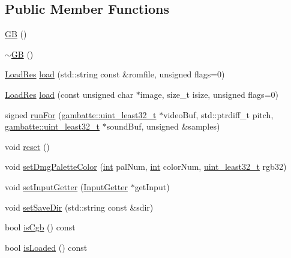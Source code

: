 \subsection*{Public Member Functions}
\begin{DoxyCompactItemize}
\item 
\hyperlink{classgambatte_1_1GB_a360f22e656d5ff564eb0dea987ae71c7}{GB} ()
\item 
\hyperlink{classgambatte_1_1GB_a27727465be963f80f4fd96449a3d9c13}{$\sim$\+GB} ()
\item 
\hyperlink{namespacegambatte_a42606f494711d2e2870a5f5cdf69e468}{Load\+Res} \hyperlink{classgambatte_1_1GB_a3eb7cf83b1634dacc796971760b31fa2}{load} (std\+::string const \&romfile, unsigned flags=0)
\item 
\hyperlink{namespacegambatte_a42606f494711d2e2870a5f5cdf69e468}{Load\+Res} \hyperlink{classgambatte_1_1GB_a4ee8c151c978541fe20a282bdcc68969}{load} (const unsigned char $\ast$image, size\+\_\+t isize, unsigned flags=0)
\item 
signed \hyperlink{classgambatte_1_1GB_a10d409c2865b9c9770bf2a19f6d77dd7}{run\+For} (\hyperlink{namespacegambatte_a0639f09fccfbbd5a8e0796318768e370}{gambatte\+::uint\+\_\+least32\+\_\+t} $\ast$video\+Buf, std\+::ptrdiff\+\_\+t pitch, \hyperlink{namespacegambatte_a0639f09fccfbbd5a8e0796318768e370}{gambatte\+::uint\+\_\+least32\+\_\+t} $\ast$sound\+Buf, unsigned \&samples)
\item 
void \hyperlink{classgambatte_1_1GB_a765c0a392c9801ab094936f2978b5000}{reset} ()
\item 
void \hyperlink{classgambatte_1_1GB_a051afa03a39e9012d5c64ea0c6e3e852}{set\+Dmg\+Palette\+Color} (\hyperlink{ioapi_8h_a787fa3cf048117ba7123753c1e74fcd6}{int} pal\+Num, \hyperlink{ioapi_8h_a787fa3cf048117ba7123753c1e74fcd6}{int} color\+Num, \hyperlink{namespacegambatte_a0639f09fccfbbd5a8e0796318768e370}{uint\+\_\+least32\+\_\+t} rgb32)
\item 
void \hyperlink{classgambatte_1_1GB_a7b722194c9472371c28285cdbf35e70f}{set\+Input\+Getter} (\hyperlink{classgambatte_1_1InputGetter}{Input\+Getter} $\ast$get\+Input)
\item 
void \hyperlink{classgambatte_1_1GB_ae5d14de04bb821ccdc2bc4d4dbc649c2}{set\+Save\+Dir} (std\+::string const \&sdir)
\item 
bool \hyperlink{classgambatte_1_1GB_a96ffbde272ed65919f851740682cac04}{is\+Cgb} () const
\item 
bool \hyperlink{classgambatte_1_1GB_ae7b16fcdf62d8dcd3c17cc1c5cad223e}{is\+Loaded} () const

\end{DoxyCompactItemize}
